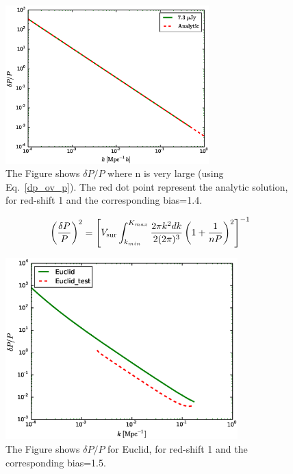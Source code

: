 \documentclass[10pt,a4paper]{article}
\begin{document}
\begin{figure}
\includegraphics[width=0.7\textwidth]{deltaP_ov_p.eps}
\caption{The Figure shows $\delta P/P$ where n is very large (using Eq.~\ref{dp_ov_p}). The red dot point represent the analytic solution, for red-shift 1 and the corresponding bias=1.4.}
\label{fig:cosmic_limit}

\end{figure}



\begin{equation}
\left( \frac{\delta P}{P} \right)^2 =\left[ V_{\rm sur} \int_{k_{min}}^{K_{max}} \frac{ 2 \pi k^2 dk}{2 (2 \pi)^3} \left(1+\frac{1}{nP}\right)^2\right]^{-1}
\end{equation}



\begin{figure}
\includegraphics[width=0.8\textwidth]{deltaP_ov_p_Euclid_2.eps}
\caption{The Figure shows $\delta P/P$  for Euclid, for red-shift 1 and the corresponding bias=1.5.}
\label{fig:cosmic_limit_Euclid_1}
\end{figure}
\end{document}

